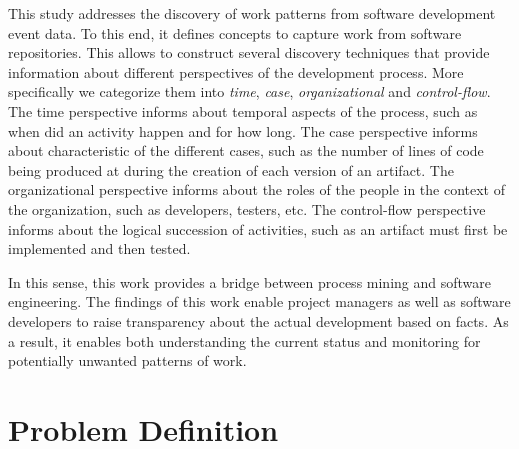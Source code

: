 This study addresses the discovery of work patterns from software development event data. To this end, it defines concepts to capture work from software repositories. This allows to construct several discovery techniques that provide information about different perspectives of the development process. More specifically we categorize them into \emph{time}, \emph{case}, \emph{organizational} and \emph{control-flow}. The time perspective informs about temporal aspects of the process, such as when did an activity happen and for how long. The case perspective informs about characteristic of the different cases, such as the number of lines of code being produced at during the creation of each version of an artifact. The organizational perspective informs about the roles of the people in the context of the organization, such as developers, testers, etc. The control-flow perspective informs about the logical succession of activities, such as an artifact must first be implemented and then tested. 

In this sense, this work provides a bridge between process mining and software engineering. The findings of this work enable project managers as well as software developers to raise transparency about the actual development based on facts. As a result, it enables both understanding the current status and monitoring for potentially unwanted patterns of work.



\section{Problem Definition}
\label{sec:problem-definition}


